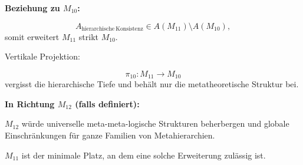 \textbf{Beziehung zu $M_{10}$:}

\[
A_{\mathrm{hierarchische\ Konsistenz}} \in A(M_{11}) \setminus A(M_{10}),
\]
somit erweitert $M_{11}$ strikt $M_{10}$.

Vertikale Projektion:

\[
\pi_{10}: M_{11} \to M_{10}
\]
vergisst die hierarchische Tiefe und behält nur die metatheoretische Struktur bei.

\textbf{In Richtung $M_{12}$ (falls definiert):}

$M_{12}$ würde universelle meta-meta-logische Strukturen beherbergen und
globale Einschränkungen für ganze Familien von Metahierarchien.

$M_{11}$ ist der minimale Platz, an dem eine solche Erweiterung zulässig ist.
